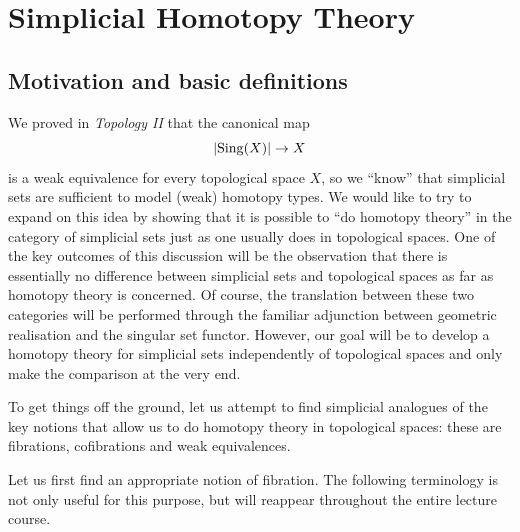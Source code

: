 \chapter{Simplicial Homotopy Theory}
\section{Motivation and basic definitions}
    We proved in \emph{Topology II} that the canonical map
    \begin{equation*}
        \left| \operatorname{Sing}(X) \right| \to X
    \end{equation*}
    is a weak equivalence for every topological space $X$, so we ``know'' that simplicial sets are sufficient to model (weak) homotopy types. We would like to try to expand on this idea by showing that it is possible to ``do homotopy theory'' in the category of simplicial sets just as one usually does in topological spaces. One of the key outcomes of this discussion will be the observation that there is essentially no difference between simplicial sets and topological spaces as far as homotopy theory is concerned. Of course, the translation between these two categories will be performed through the familiar adjunction between geometric realisation and the singular set functor. However, our goal will be to develop a homotopy theory for simplicial sets independently of topological spaces and only make the comparison at the very end.

    To get things off the ground, let us attempt to find simplicial analogues of the key notions that allow us to do homotopy theory in topological spaces: these are fibrations, cofibrations and weak equivalences.

    Let us first find an appropriate notion of fibration. The following terminology is not only useful for this purpose, but will reappear throughout the entire lecture course.

